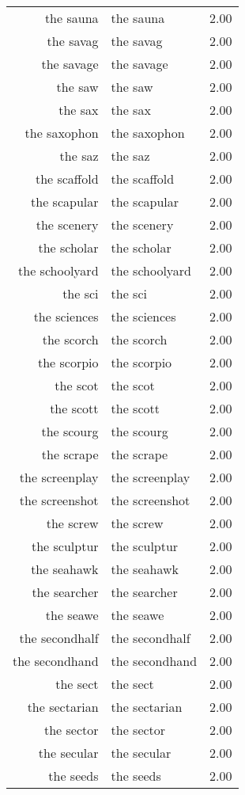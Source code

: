 \begin{table}[ht]
\begin{tabular}{rlr}
  the sauna & the sauna & 2.00 \\ 
  the savag & the savag & 2.00 \\ 
  the savage & the savage & 2.00 \\ 
  the saw & the saw & 2.00 \\ 
  the sax & the sax & 2.00 \\ 
  the saxophon & the saxophon & 2.00 \\ 
  the saz & the saz & 2.00 \\ 
  the scaffold & the scaffold & 2.00 \\ 
  the scapular & the scapular & 2.00 \\ 
  the scenery & the scenery & 2.00 \\ 
  the scholar & the scholar & 2.00 \\ 
  the schoolyard & the schoolyard & 2.00 \\ 
  the sci & the sci & 2.00 \\ 
  the sciences & the sciences & 2.00 \\ 
  the scorch & the scorch & 2.00 \\ 
  the scorpio & the scorpio & 2.00 \\ 
  the scot & the scot & 2.00 \\ 
  the scott & the scott & 2.00 \\ 
  the scourg & the scourg & 2.00 \\ 
  the scrape & the scrape & 2.00 \\ 
  the screenplay & the screenplay & 2.00 \\ 
  the screenshot & the screenshot & 2.00 \\ 
  the screw & the screw & 2.00 \\ 
  the sculptur & the sculptur & 2.00 \\ 
  the seahawk & the seahawk & 2.00 \\ 
  the searcher & the searcher & 2.00 \\ 
  the seawe & the seawe & 2.00 \\ 
  the secondhalf & the secondhalf & 2.00 \\ 
  the secondhand & the secondhand & 2.00 \\ 
  the sect & the sect & 2.00 \\ 
  the sectarian & the sectarian & 2.00 \\ 
  the sector & the sector & 2.00 \\ 
  the secular & the secular & 2.00 \\ 
  the seeds & the seeds & 2.00 \\ 

\end{tabular}
\end{table}
